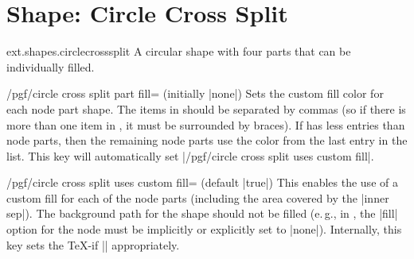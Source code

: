 %
%
%
\section{Shape: Circle Cross Split}
\begin{pgflibrary}{ext.shapes.circlecrosssplit}
  A circular shape with four parts that can be individually filled.
\end{pgflibrary}
\begin{key}{/pgf/circle cross split part fill= (initially |none|)}
Sets the custom fill color for each node part shape.
The items in  should be separated by commas
(so if there is more than one item in , it must be surrounded by braces).
If  has less entries than node parts,
then the remaining node parts use the color from the last entry in the list.
This key will automatically set |/pgf/circle cross split uses custom fill|.
\end{key}
\begin{key}{/pgf/circle cross split uses custom fill= (default |true|)}
This enables the use of a custom fill for each of the node parts
(including the area covered by the |inner sep|).
The background path for the shape should not be filled (e.\,g., in \tikzname,
the |fill| option for the node must be implicitly or explicitly set to |none|).
Internally, this key sets the TeX-if |\ifpgfcirclecrosssplitcustomfill| appropriately. 
\end{key}
\begin{codeexample}[preamble=\usepgflibrary{ext.shapes.circlecrosssplit}]
\end{codeexample}

